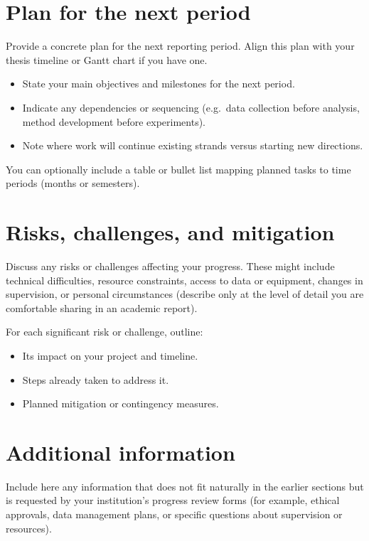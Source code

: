\documentclass[sans,oneside,numeric,raggedright]{qreport}
\begin{document}
\section{Plan for the next period}

Provide a concrete plan for the next reporting period. Align this plan
with your thesis timeline or Gantt chart if you have one.

\begin{itemize}[leftmargin=2em]
  \item State your main objectives and milestones for the next period.
  \item Indicate any dependencies or sequencing (e.g.\ data collection
        before analysis, method development before experiments).
  \item Note where work will continue existing strands versus starting new
        directions.
\end{itemize}

You can optionally include a table or bullet list mapping planned tasks to
time periods (months or semesters).

\section{Risks, challenges, and mitigation}

Discuss any risks or challenges affecting your progress. These might include
technical difficulties, resource constraints, access to data or equipment,
changes in supervision, or personal circumstances (describe only at the level
of detail you are comfortable sharing in an academic report).

For each significant risk or challenge, outline:

\begin{itemize}[leftmargin=2em]
  \item Its impact on your project and timeline.
  \item Steps already taken to address it.
  \item Planned mitigation or contingency measures.
\end{itemize}

\section{Additional information}

Include here any information that does not fit naturally in the earlier
sections but is requested by your institution's progress review forms (for
example, ethical approvals, data management plans, or specific questions
about supervision or resources).
\end{document}
